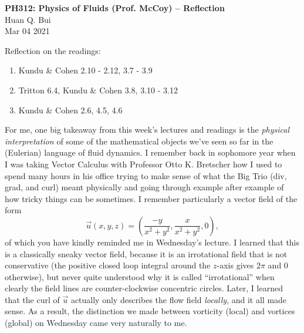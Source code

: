 \documentclass[11pt]{article}
\newcommand{\f}[2]{\frac{#1}{#2}}
\begin{document}
\begin{center}
{\large \bf PH312: Physics of Fluids (Prof. McCoy) -- Reflection}\\
{ Huan Q. Bui}\\
Mar 04 2021
\end{center}

\begin{framed}
	\noindent Reflection on the readings:
	\begin{enumerate}
		\item Kundu \& Cohen 2.10 - 2.12, 3.7 - 3.9
		\item Tritton 6.4, Kundu \& Cohen 3.8, 3.10 - 3.12
		\item Kundu \& Cohen 2.6, 4.5, 4.6
	\end{enumerate}
\end{framed}

For me, one big takeaway from this week's lectures and readings is the \textit{physical interpretation} of some of the mathematical objects we've seen so far in the (Eulerian) language of fluid dynamics. I remember back in sophomore year when I was taking Vector Calculus with Professor Otto K. Bretscher how I used to spend many hours in his office trying to make sense of what the Big Trio (div, grad, and curl) meant physically and going through example after example of how tricky things can be sometimes. I remember particularly a vector field of the form
\begin{equation*}
\vec{u}(x,y,z) = \left( \frac{-y}{x^2+y^2}, \f{x}{x^2+y^2} ,0 \right),
\end{equation*}
of which you have kindly reminded me in Wednesday's lecture. I learned that this is a classically sneaky vector field, because it is an irrotational field that is not conservative (the positive closed loop integral around the $z$-axis gives $2\pi$ and 0 otherwise), but never quite understood why it is called ``irrotational'' when clearly the field lines are counter-clockwise concentric circles. Later, I learned that the curl of $\vec{u}$ actually only describes the flow field \textit{locally}, and it all made sense. As a result, the distinction we made between vorticity (local) and vortices (global) on Wednesday came very naturally to me. \\
\end{document}
